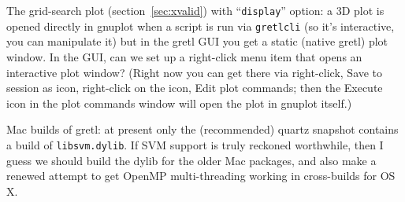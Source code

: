 \documentclass{article}
\begin{document}
The grid-search plot (section~\ref{sec:xvalid}) with
``\texttt{display}'' option: a 3D plot is opened directly in
\textsf{gnuplot} when a script is run via \texttt{gretlcli} (so it's
interactive, you can manipulate it) but in the gretl GUI you get a
static (native gretl) plot window. In the GUI, can we set up a
right-click menu item that opens an interactive plot window? (Right
now you can get there via right-click, Save to session as icon,
right-click on the icon, Edit plot commands; then the Execute icon in
the plot commands window will open the plot in \textsf{gnuplot}
itself.)

Mac builds of gretl: at present only the (recommended) quartz snapshot
contains a build of \texttt{libsvm.dylib}.  If SVM support is truly
reckoned worthwhile, then I guess we should build the dylib for the
older Mac packages, and also make a renewed attempt to get
\textsf{OpenMP} multi-threading working in cross-builds for OS X.
\end{document}
